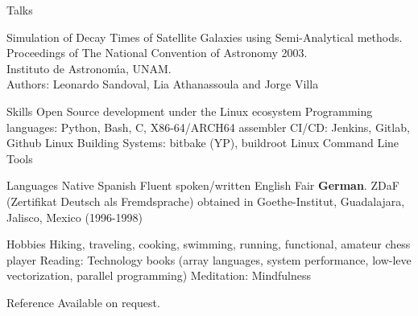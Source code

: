\documentclass{resume}
\begin{document}
\begin{category}{Talks}

\citembullet Simulation of Decay Times of Satellite Galaxies using Semi-Analytical methods.\\
Proceedings of The National Convention of Astronomy 2003.\\
Instituto de Astronom\'{\i}a, UNAM. \\
Authors: Leonardo Sandoval, Lia Athanassoula and Jorge Villa
\end{category}

\begin{category}{Skills}
  \citembullet Open Source development under the Linux ecosystem
  \citembullet Programming languages: Python, Bash, C, X86-64/ARCH64 assembler
  \citembullet CI/CD: Jenkins, Gitlab, Github
  \citembullet Linux Building Systems: bitbake (YP), buildroot
  \citembullet Linux Command Line Tools
\end{category}

\begin{category}{Languages}
  \citembullet Native Spanish
  \citembullet Fluent spoken/written English
  \citembullet Fair \textbf{German}. ZDaF (Zertifikat Deutsch als Fremdsprache) obtained in Goethe-Institut, Guadalajara, Jalisco, Mexico (1996-1998)
\end{category}

\begin{category}{Hobbies}
  \citembullet Hiking, traveling, cooking, swimming, running, functional, amateur chess player
  \citembullet Reading: Technology books (array languages, system performance, low-leve vectorization, parallel programming)
  \citembullet Meditation: Mindfulness
\end{category}

\begin{category}{Reference} 
  \citemnobullet Available on request.
\end{category}
\end{document}

